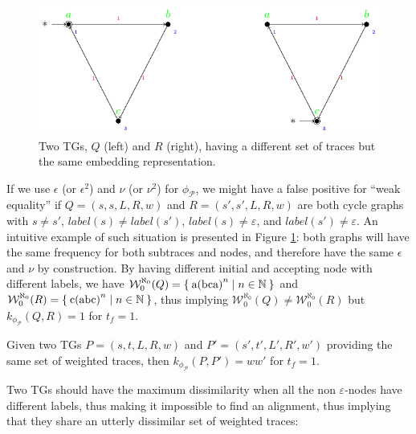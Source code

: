 \begin{figure}[!t]
	\centering
	\includegraphics[scale=.8]{images/counterexample.pdf}
	\caption{Two TGs, $Q$ (left) and $R$ (right), having a different set of traces but the same embedding representation.}\label{fig:counterexample}
\end{figure}
\begin{example}
	If we use $\epsilon$ (or $\epsilon^2$) and $\nu$ (or $\nu^2$) for $\phi_{\mathcal{P}}$, we might have a false positive for ``weak equality'' if $Q=(s,s,L,R,w)$ and $R=(s',s',L,R,w)$ are both cycle graphs with $s\neq s'$, $\textit{label}(s)\neq\textit{label}(s')$, $\textit{label}(s)\neq\varepsilon$, and $\textit{label}(s')\neq\varepsilon$. An intuitive example of such situation is presented in Figure \ref{fig:counterexample}: both graphs will have the same frequency for both subtraces and nodes, and therefore have the same  $\epsilon$ and $\nu$ by construction. By having different initial and accepting node with  different labels, we have $\mathcal{W}_0^{\aleph_0}(Q)=\Set{\textup{a(bca)}^n|n\in\mathbb{N}}$ and $\mathcal{W}_0^{\aleph_0}(R)=\Set{\textup{c(abc)}^n|n\in\mathbb{N}}$, thus implying $\mathcal{W}_0^{\aleph_0}(Q)\neq\mathcal{W}_0^{\aleph_0}(R)$ but $k_{\phi_{\mathcal{P}}}(Q,R)=1$ for $t_f=1$.
\end{example}


\begin{lemma}
	Given two TGs $P=(s,t,L,R,w)$ and $P'=(s',t',L',R',w')$ providing the same set of weighted traces, then $k_{\phi_{\mathcal{P}}}(P,P')=ww'$ for $t_f=1$.
\end{lemma}

Two TGs should have the maximum dissimilarity when all the non $\varepsilon$-nodes have different labels, thus making it impossible to find an alignment, thus implying that they share an utterly dissimilar set of weighted traces:

